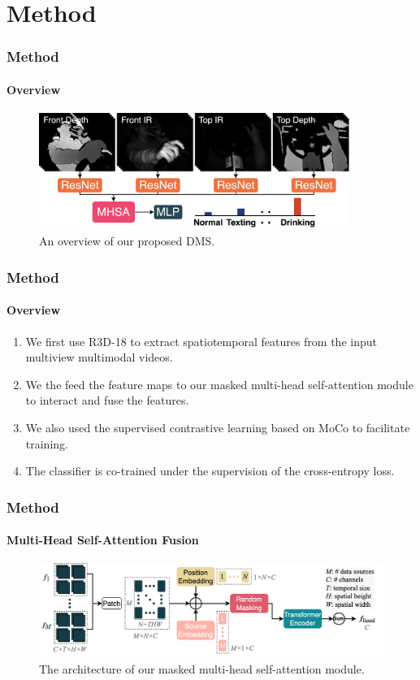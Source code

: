 \section{Method}

\begin{frame}
\frametitle{Method}
\framesubtitle{Overview}

\begin{figure}
    \centering
    \includegraphics[width=0.9\textwidth]{images/overview.png}
    \caption{An overview of our proposed DMS.}
    \label{fig:4}
\end{figure}
\end{frame}

\begin{frame}
\frametitle{Method}
\framesubtitle{Overview}

\begin{enumerate}
    \item We first use R3D-18 \cite{tran2018closer} to extract spatiotemporal features from the input multiview multimodal videos. 
    \item We the feed the feature maps to our masked multi-head self-attention module to interact and fuse the features.
    \item We also used the supervised contrastive learning based on MoCo \cite{he2020momentum} to facilitate training.
    \item The classifier is co-trained under the supervision of the cross-entropy loss.
\end{enumerate}

\end{frame}

\begin{frame}
\frametitle{Method}
\framesubtitle{Multi-Head Self-Attention Fusion}

\begin{figure}
    \centering
    \includegraphics[width=\textwidth]{images/fusion_mhsa_2.png}
    \caption{The architecture of our masked multi-head self-attention module.}
    \label{fig:5}
\end{figure}

\end{frame}

